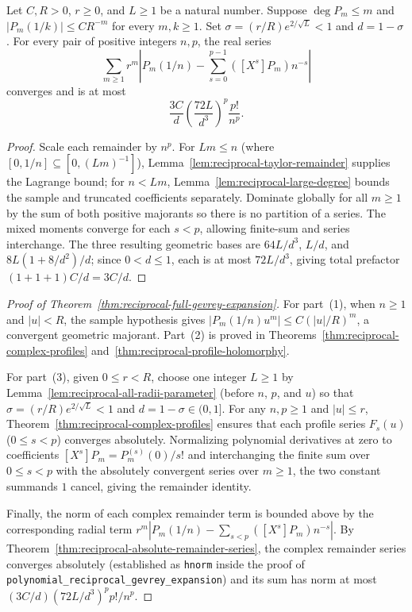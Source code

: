 \begin{theorem}
\label{thm:reciprocal-absolute-remainder-series}
\leanok
{}
Let $C,R>0$, $r\ge0$, and $L\ge1$ be a natural number. Suppose
$\deg P_m\le m$ and $|P_m(1/k)|\le C R^{-m}$ for every $m,k\ge1$.
Set $\sigma=(r/R)e^{2/\sqrt L}<1$ and $d=1-\sigma$.
For every pair of positive integers $n,p$, the real series
\[
 \sum_{m\ge1}r^m\left|P_m(1/n)-
   \sum_{s=0}^{p-1}([X^s]P_m)n^{-s}\right|
\]
converges and is at most
\[
 \frac{3C}{d}\left(\frac{72L}{d^3}\right)^p\frac{p!}{n^p}.
\]
\end{theorem}
\begin{proof}
Scale each remainder by $n^p$. For $Lm\le n$ (where $[0, 1/n] \subseteq [0, (Lm)^{-1}]$), Lemma~\ref{lem:reciprocal-taylor-remainder} supplies the Lagrange bound; for $n<Lm$, Lemma~\ref{lem:reciprocal-large-degree} bounds the sample and truncated coefficients separately. Dominate globally for all $m \ge 1$ by the sum of both positive majorants so there is no partition of a series.
The mixed moments converge for each $s<p$, allowing finite-sum and series interchange. The three resulting geometric bases are
$64L/d^3$, $L/d$, and $8L(1+8/d^2)/d$; since $0<d\le1$, each is at most $72L/d^3$, giving total prefactor $(1 + 1 + 1)C/d = 3C/d$.
\end{proof}

\begin{proof}[Proof of Theorem~\ref{thm:reciprocal-full-gevrey-expansion}]
For part~(1), when $n \ge 1$ and $|u| < R$, the sample hypothesis gives $|P_m(1/n) u^m| \le C(|u|/R)^m$, a convergent geometric majorant. Part~(2) is proved in Theorems~\ref{thm:reciprocal-complex-profiles} and~\ref{thm:reciprocal-profile-holomorphy}.

For part~(3), given $0 \le r < R$, choose one integer $L \ge 1$ by Lemma~\ref{lem:reciprocal-all-radii-parameter} (before $n$, $p$, and $u$) so that $\sigma = (r/R)e^{2/\sqrt{L}} < 1$ and $d = 1 - \sigma \in (0, 1]$. For any $n, p \ge 1$ and $|u| \le r$, Theorem~\ref{thm:reciprocal-complex-profiles} ensures that each profile series $F_s(u)$ ($0 \le s < p$) converges absolutely. Normalizing polynomial derivatives at zero to coefficients $[X^s]P_m = P_m^{(s)}(0)/s!$ and interchanging the finite sum over $0 \le s < p$ with the absolutely convergent series over $m \ge 1$, the two constant summands $1$ cancel, giving the remainder identity.

Finally, the norm of each complex remainder term is bounded above by the corresponding radial term $r^m |P_m(1/n) - \sum_{s<p}([X^s]P_m)n^{-s}|$. By Theorem~\ref{thm:reciprocal-absolute-remainder-series}, the complex remainder series converges absolutely (established as \texttt{hnorm} inside the proof of \texttt{polynomial\_reciprocal\_gevrey\_expansion}) and its sum has norm at most $(3C/d)(72L/d^3)^p p! / n^p$.
\end{proof}

